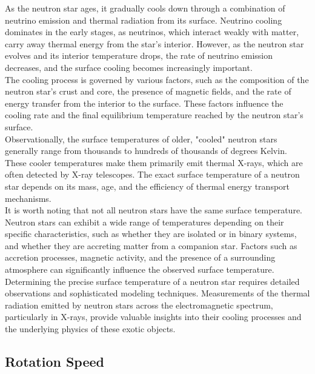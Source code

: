 As the neutron star ages, it gradually cools down through a combination of neutrino emission and thermal radiation from its surface. Neutrino cooling dominates in the early stages, as neutrinos, which interact weakly with matter, carry away thermal energy from the star's interior. However, as the neutron star evolves and its interior temperature drops, the rate of neutrino emission decreases, and the surface cooling becomes increasingly important.\\

The cooling process is governed by various factors, such as the composition of the neutron star's crust and core, the presence of magnetic fields, and the rate of energy transfer from the interior to the surface. These factors influence the cooling rate and the final equilibrium temperature reached by the neutron star's surface.\\

Observationally, the surface temperatures of older, "cooled" neutron stars generally range from thousands to hundreds of thousands of degrees Kelvin. These cooler temperatures make them primarily emit thermal X-rays, which are often detected by X-ray telescopes. The exact surface temperature of a neutron star depends on its mass, age, and the efficiency of thermal energy transport mechanisms.\\

It is worth noting that not all neutron stars have the same surface temperature. Neutron stars can exhibit a wide range of temperatures depending on their specific characteristics, such as whether they are isolated or in binary systems, and whether they are accreting matter from a companion star. Factors such as accretion processes, magnetic activity, and the presence of a surrounding atmosphere can significantly influence the observed surface temperature.\\

Determining the precise surface temperature of a neutron star requires detailed observations and sophisticated modeling techniques. Measurements of the thermal radiation emitted by neutron stars across the electromagnetic spectrum, particularly in X-rays, provide valuable insights into their cooling processes and the underlying physics of these exotic objects.

\subsection{Rotation Speed}

